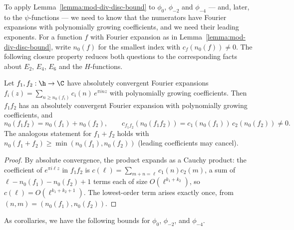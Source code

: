 To apply Lemma~\ref{lemma:mod-div-disc-bound} to $\phi_0$, $\phi_{-2}$ and $\phi_{-4}$ --- and, later, to the $\psi$-functions --- we need to know that the numerators have Fourier expansions with polynomially growing coefficients, and we need their leading exponents. For a function $f$ with Fourier expansion as in Lemma~\ref{lemma:mod-div-disc-bound}, write $n_0(f)$ for the smallest index with $c_f(n_0(f)) \neq 0$. The following closure property reduces both questions to the corresponding facts about $E_2$, $E_4$, $E_6$ and the $H$-functions.

\begin{lemma}\label{lemma:poly-growth-mul}
Let $f_1, f_2 : \h \to \C$ have absolutely convergent Fourier expansions $f_i(z) = \sum_{n \geq n_0(f_i)} c_i(n)\, e^{\pi i n z}$ with polynomially growing coefficients. Then $f_1 f_2$ has an absolutely convergent Fourier expansion with polynomially growing coefficients, and
\[
  n_0(f_1 f_2) = n_0(f_1) + n_0(f_2), \qquad c_{f_1 f_2}(n_0(f_1 f_2)) = c_1(n_0(f_1))\, c_2(n_0(f_2)) \neq 0.
\]
The analogous statement for $f_1 + f_2$ holds with $n_0(f_1 + f_2) \geq \min(n_0(f_1), n_0(f_2))$ (leading coefficients may cancel).
\end{lemma}
\begin{proof}
By absolute convergence, the product expands as a Cauchy product: the coefficient of $e^{\pi i \ell z}$ in $f_1 f_2$ is $c(\ell) = \sum_{m + n = \ell} c_1(n) c_2(m)$, a sum of $\ell - n_0(f_1) - n_0(f_2) + 1$ terms each of size $O(\ell^{k_1 + k_2})$, so $c(\ell) = O(\ell^{k_1 + k_2 + 1})$. The lowest-order term arises exactly once, from $(n, m) = (n_0(f_1), n_0(f_2))$.
\end{proof}

As corollaries, we have the following bounds for $\phi_0$, $\phi_{-2}$, and $\phi_{-4}$.

